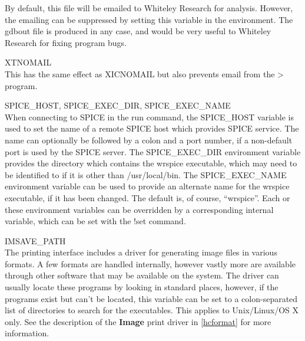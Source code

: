 \begin{description}
By default, this file will be emailed to Whiteley Research for
analysis.  However, the emailing can be suppressed by setting this
variable in the environment.  The {\vt gdbout} file is produced in any
case, and would be very useful to Whiteley Research for fixing program
bugs.

\item{\et XTNOMAIL}\\
This has the same effect as {\et XICNOMAIL} but also prevents email
from the {\WRspice}> program.

\item{{\et SPICE\_HOST}, {\et SPICE\_EXEC\_DIR}, {\et SPICE\_EXEC\_NAME}}\\
When connecting to SPICE in the {\cb run} command, the {\et
SPICE\_HOST} variable is used to set the name of a remote SPICE host
which provides SPICE service.  The name can optionally be followed by
a colon and a port number, if a non-default port is used by the SPICE
server.  The {\et SPICE\_EXEC\_DIR} environment variable provides the
directory which contains the {\vt wrspice} executable, which may need
to be identified to {\Xic} if it is other than {\vt /usr/local/bin}. 
The {\et SPICE\_EXEC\_NAME} environment variable can be used to
provide an alternate name for the {\vt wrspice} executable, if it has
been changed.  The default is, of course, ``{\vt wrspice}''.  Each or
these environment variables can be overridden by a corresponding
internal variable, which can be set with the {\cb !set} command.

\item{\et IMSAVE\_PATH}\\
The printing interface includes a driver for generating image files in
various formats.  A few formats are handled internally, however vastly
more are available through other software that may be available on the
system.  The driver can usually locate these programs by looking in
standard places, however, if the programs exist but can't be located,
this variable can be set to a colon-separated list of directories to
search for the executables.  This applies to Unix/Linux/OS X only. 
See the description of the {\bf Image} print driver in \ref{hcformat}
for more information.
\end{description}


